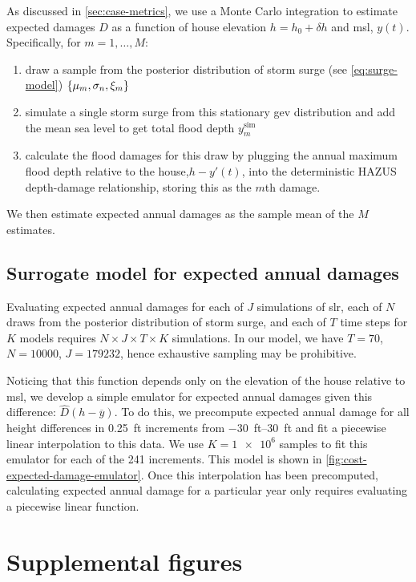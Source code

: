 \documentclass[11pt]{article}
\begin{document}
As discussed in \cref{sec:case-metrics}, we use a Monte Carlo integration to estimate expected damages $D$ as a function of house elevation $h = h_0 + \delta h$ and \gls{msl}, $y(t)$.
Specifically, for $m=1, \ldots, M$:
\begin{enumerate}
    \item draw a sample from the posterior distribution of storm surge (see \cref{eq:surge-model})  $\qty{ \mu_m, \sigma_n, \xi_m}$
    \item simulate a single storm surge from this stationary \gls{gev} distribution and add the mean sea level to get total flood depth $y^\mathrm{sim}_m$
    \item calculate the flood damages for this draw by plugging the annual maximum flood depth relative to the house,$h - y'(t)$, into  the deterministic HAZUS depth-damage relationship, storing this as the $m$th damage.
\end{enumerate}
We then estimate expected annual damages as the sample mean of the $M$ estimates.

\subsection{Surrogate model for expected annual damages}\label{sec:surrogate-ead}
Evaluating expected annual damages for each of $J$ simulations of \gls{slr}, each of $N$ draws from the posterior distribution of storm surge, and each of $T$ time steps for $K$ models requires $N \times J \times T \times K$ simulations.
In our model, we have $T=70$, $N=\num{10000}$, $J=\num{179232}$, hence exhaustive sampling may be prohibitive.

Noticing that this function depends only on the elevation of the house relative to \gls{msl}, we develop a simple emulator for expected annual damages given this difference: $\hat{D}(h - \overline{y})$.
To do this, we  precompute expected annual damage for all height differences in \SI{0.25}{ft} increments from \SIrange{-30}{30}{ft} and fit a piecewise linear interpolation to this data.
We use $K=\num{1e6}$ samples to fit this emulator for each of the 241 increments.
This model is shown in \cref{fig:cost-expected-damage-emulator}.
Once this interpolation has been precomputed, calculating expected annual damage for a particular year only requires evaluating a piecewise linear function.

\section{Supplemental figures}
\end{document}
